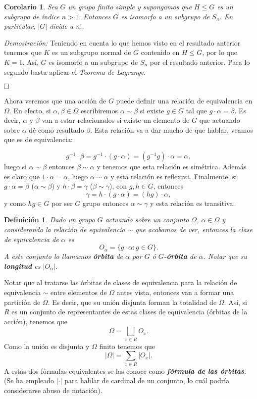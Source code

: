 \documentclass[12pt]{article}
\newtheorem{definition}[theorem]{Definición}
\newtheorem{corolario}{Corolario}[theorem]
\begin{document}
\begin{corolario}Sea $G$ un grupo finito simple y supongamos que $H \leq G$ es un subgrupo de índice $n > 1$. Entonces $G$ es isomorfo a un subgrupo de $S_n$. En particular, $|G|$ divide a $n!$.
\end{corolario}
\emph{Demostración: }Teniendo en cuenta lo que hemos visto en el resultado anterior tenemos que $K$ es un subgrupo normal de $G$ contenido en $H\leq G$, por lo que $K = 1$. Así, $G$ es isomorfo a un subgrupo de $S_n$ por el resultado anterior. Para lo segundo basta aplicar el \textit{Teorema de Lagrange}.

$\hfill \square$

Ahora veremos que una acción de $G$ puede definir una relación de equivalencia en $\Omega$. En efecto, si $\alpha, \beta \in \Omega$ escribiremos $\alpha \sim \beta $ si existe $g \in G$ tal que $g \cdot \alpha = \beta$. Es decir, $\alpha$ y $\beta$ van a estar relacionados si existe un elemento de $G$ que actuando sobre $\alpha$ dé como resultado $\beta$. Esta relación va a dar mucho de que hablar, veamos que es de equivalencia:

$$g^{-1} \cdot \beta = g^{-1} \cdot (g \cdot \alpha ) = (g^{-1}g) \cdot \alpha = \alpha, $$ luego si $\alpha \sim \beta$ entonces $\beta \sim \alpha$ y tenemos que esta relación es simétrica. Además es claro que $1 \cdot \alpha = \alpha$, luego $\alpha \sim \alpha$ y esta relación es reflexiva. Finalmente, si $g \cdot \alpha = \beta$ ($\alpha \sim \beta$) y $h \cdot \beta = \gamma$ ($\beta \sim \gamma$), con $g, h \in G$, entonces $$\gamma = h \cdot (g \cdot \alpha) = (hg) \cdot \alpha,$$ y como $hg \in G$ por ser $G$ grupo entonces $\alpha \sim \gamma$ y esta relación es transitiva.

\begin{definition}Dado un grupo $G$ actuando sobre un conjunto $\Omega$, $\alpha \in \Omega$ y considerando la relación de equivalencia $\sim$ que acabamos de ver, entonces la clase de equivalencia de $\alpha$ es $$O_{\alpha} = \lbrace g\cdot \alpha : g \in G \rbrace.$$ A este conjunto lo llamamos \textbf{órbita} de $\alpha$ por $G$ ó \textbf{$G$-órbita} de $\alpha$. Notar que su \textbf{longitud} es $|O_{\alpha}|$.
\end{definition}

Notar que al tratarse las órbitas de clases de equivalencia para la relación de equivalencia $\sim$ entre elementos de $\Omega$ antes vista, entonces van a formar una partición de $\Omega.$ Es decir, que su unión disjunta forman la totalidad de $\Omega$. Así, si $R$ es un conjunto de representantes de estas clases de equivalencia (órbitas de la acción), tenemos que $$\Omega = \bigsqcup_{x\in R} O_x.$$ Como la unión es disjunta y $\Omega$ finito tenemos que $$|\Omega | = \sum_{x\in R} |O_x|.$$ A estas dos fórmulas equivalentes se las conoce como \textbf{\textit{fórmula de las órbitas}}. (Se ha empleado $|\cdot|$ para hablar de cardinal de un conjunto, lo cuál podría considerarse abuso de notación).
\end{document}
